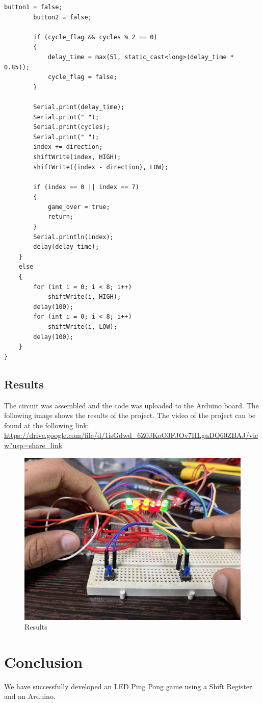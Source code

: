 \documentclass[12pt, a4paper, oneside]{report}
\begin{document}
\begin{lstlisting}[style=myArduino]
        button1 = false;
        button2 = false;

        if (cycle_flag && cycles % 2 == 0)
        {
            delay_time = max(5l, static_cast<long>(delay_time * 0.85));
            cycle_flag = false;
        }

        Serial.print(delay_time);
        Serial.print(" ");
        Serial.print(cycles);
        Serial.print(" ");
        index += direction;
        shiftWrite(index, HIGH);
        shiftWrite((index - direction), LOW);

        if (index == 0 || index == 7)
        {
            game_over = true;
            return;
        }
        Serial.println(index);
        delay(delay_time);
    }
    else
    {
        for (int i = 0; i < 8; i++)
            shiftWrite(i, HIGH);
        delay(100);
        for (int i = 0; i < 8; i++)
            shiftWrite(i, LOW);
        delay(100);
    }
}

\end{lstlisting}

\section{Results}

The circuit was assembled and the code was uploaded to the Arduino board. The following image shows the results of the project. 
The video of the project can be found at the following link: \url{https://drive.google.com/file/d/1isGdwd_6Z0JKoO3FJOv7HLgnDQ60ZBAJ/view?usp=share_link}

\begin{figure}[h]
    \centering
    \includegraphics[width=.7\textwidth]{images/LED_result.jpeg}
    \caption{Results}
    \label{fig: results}
\end{figure}





\chapter{Conclusion}

We have successfully developed an LED Ping Pong game using a Shift Register and an Arduino.
\end{document}
